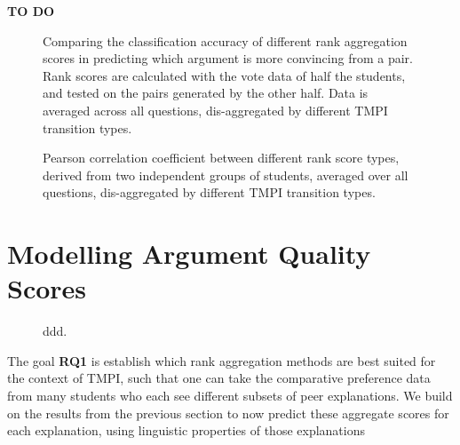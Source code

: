 \documentclass[notitlepage,12pt]{jedm}
\begin{document}
\textbf{TO DO}



\begin{figure}
	\scalebox{0.6}{}
	\caption{
		Comparing the classification accuracy of different rank aggregation 
		scores in predicting which argument is more convincing from a pair. 
		Rank scores are calculated with the vote data of half the students, and 
		tested on the pairs generated by the other half. 
		Data is averaged across all questions, dis-aggregated by different TMPI 
		transition types. 
	}
	\label{fig:acc_by_rank_score_type}
\end{figure}

\begin{figure}
	\scalebox{0.6}{}
	\caption{
		Pearson correlation coefficient between different rank score types, 
		derived from two independent groups of students, averaged over all 
		questions, dis-aggregated by different TMPI transition types.
	}
	\label{fig:acc_by_rank_score_type}
\end{figure}






\section{Modelling Argument Quality Scores}\label{sec:model}

\begin{figure}
	\scalebox{0.6}{}
	\caption{
		ddd.
	}
	\label{fig:acc_by_rank_score_type}
\end{figure}

The goal \textbf{RQ1} is establish which rank aggregation methods are best 
suited for the context of TMPI, such that one can take the comparative 
preference data from many students who each see different subsets of peer 
explanations.
We build on the results from the previous section to now predict these 
aggregate scores for each explanation, using 
linguistic properties of those explanations
\end{document}
